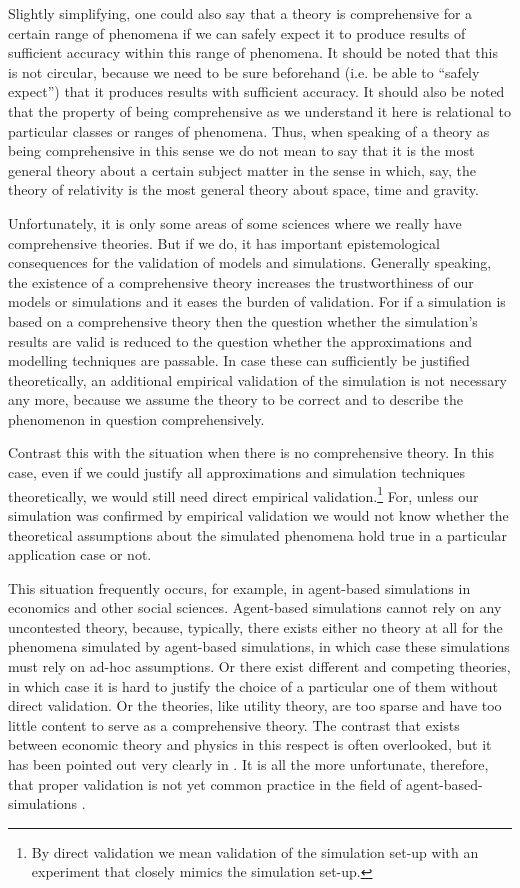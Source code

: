 \documentclass[12pt, a4paper]{article}
\numberwithin{equation}{section}
\begin{document}
Slightly simplifying, one could also say that a theory is
comprehensive for a certain range of phenomena if we can safely expect
it to produce results of sufficient accuracy within this range of
phenomena. It should be noted that this is not circular, because we
need to be sure beforehand (i.e. be able to ``safely expect'') that it
produces results with sufficient accuracy. It should also be noted
that the property of being comprehensive as we understand it here is
relational to particular classes or ranges of phenomena. Thus, when
speaking of a theory as being comprehensive in this sense we do not
mean to say that it is the most general theory about a certain subject
matter in the sense in which, say, the theory of relativity is the
most general theory about space, time and gravity.

Unfortunately, it is only some areas of some sciences where we really
have comprehensive theories. But if we do, it has important
epistemological consequences for the validation of models and
simulations. Generally speaking, the existence of a comprehensive
theory increases the trustworthiness of our models or simulations and
it eases the burden of validation. For if a simulation is based on a
comprehensive theory then the question whether the simulation's
results are valid is reduced to the question whether the
approximations and modelling techniques are passable. In case these
can sufficiently be justified theoretically, an additional empirical
validation of the simulation is not necessary any more, because we
assume the theory to be correct and to describe the phenomenon in
question comprehensively.

Contrast this with the situation when there is no comprehensive theory. In
this case, even if we could justify all approximations and simulation
techniques theoretically, we would still need direct empirical
validation.\footnote{By direct validation we mean validation of the
  simulation set-up with an experiment that closely mimics the
  simulation set-up.} For, unless our simulation was confirmed by
empirical validation we would not know whether the theoretical
assumptions about the simulated phenomena hold true in a particular
application case or not.

This situation frequently occurs, for example, in agent-based
simulations in economics and other social sciences. Agent-based
simulations cannot rely on any uncontested theory, because, typically,
there exists either no theory at all for the phenomena simulated by
agent-based simulations, in which case these simulations must rely on
ad-hoc assumptions. Or there exist different and competing theories,
in which case it is hard to justify the choice of a particular one of
them without direct validation. Or the theories, like utility theory,
are too sparse and have too little content to serve as a comprehensive
theory. The contrast that exists between economic theory and physics
in this respect is often overlooked, but it has been pointed out very
clearly in \citet[p.\ 48/49]{cartwright:2009}. It is all the more
unfortunate, therefore, that proper validation is not yet common
practice in the field of agent-based-simulations
\citep{heath-et-al:2009}.
\end{document}
